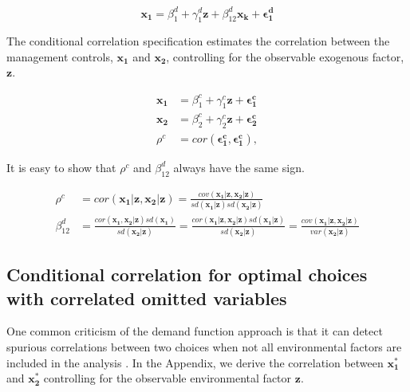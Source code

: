 \documentclass[12pt]{article}
\begin{document}
\[
\mathbf{x_1} = \beta_1^d + \gamma_1^d \mathbf{z} + \beta_{12}^d \mathbf{x_k}
  + \mathbf{\epsilon^d_1}
\]

The conditional correlation specification estimates the correlation
between the management controls, \(\mathbf{x_1}\) and \(\mathbf{x_2}\),
controlling for the observable exogenous factor, \(\mathbf{z}\).

\begin{align*}
\mathbf{x_1} &= \beta_1^c + \gamma_1^c \mathbf{z} + \mathbf{\epsilon^c_1} \\
\mathbf{x_2} &= \beta_2^c + \gamma_2^c \mathbf{z} + \mathbf{\epsilon^c_2} \\
\rho^c &= cor(\mathbf{\epsilon^c_1}, \mathbf{\epsilon^c_1}),
\end{align*}

It is easy to show that \(\rho^c\) and \(\beta^d_{12}\) always have the
same sign.

\begin{align}\label{eq:coefficient}
\rho^c &= cor(\mathbf{x_1}|\mathbf{z}, \mathbf{x_2}|\mathbf{z}) =
\frac{
      cov(\mathbf{x_1}|\mathbf{z},\mathbf{x_2}|\mathbf{z})
      }{
      sd(\mathbf{x_1}|\mathbf{z}) sd(\mathbf{x_2}|\mathbf{z})
      } \nonumber \\
\beta^d_{12} &=
\frac{
      cor(\mathbf{x_1}, \mathbf{x_2}|\mathbf{z}) sd(\mathbf{x_1})
      }{
      sd(\mathbf{x_2} | \mathbf{z})
      }
      =
 \frac{
      cor(\mathbf{x_1}|\mathbf{z}, \mathbf{x_2}|\mathbf{z})
      sd(\mathbf{x_1} | \mathbf{z})
      }{
      sd(\mathbf{x_2} | \mathbf{z})
      }
      =
\frac{
     cov(\mathbf{x_1}|\mathbf{z}, \mathbf{x_2}|\mathbf{z})
     }{
     var(\mathbf{x_2} | \mathbf{z})
     }
\end{align}

\subsection{Conditional correlation for optimal choices with correlated
omitted
variables}\label{conditional-correlation-for-optimal-choices-with-correlated-omitted-variables}

One common criticism of the demand function approach is that it can
detect spurious correlations between two choices when not all
environmental factors are included in the analysis \citep{Grabner2013}.
In the Appendix, we derive the correlation between \(\mathbf{x^*_1}\)
and \(\mathbf{x^*_2}\) controlling for the observable environmental
factor \(\mathbf{z}\).
\end{document}
